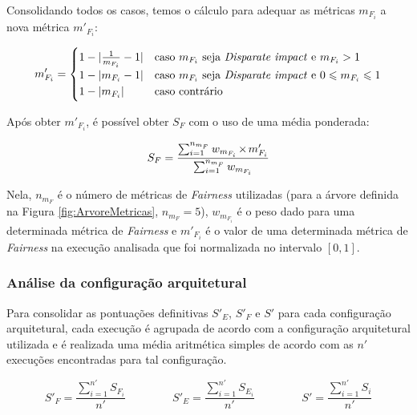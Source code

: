 \documentclass[portugues]{ic-tese}
\let\oldtimes\times
\def\times{{\mkern1mu\oldtimes\mkern1mu}}
\begin{document}
Consolidando todos os casos, temos o cálculo para adequar as métricas $m_{F_i}$ a nova métrica $m'_{F_i}$:

\begin{equation}
\label{eqn:normalizationFairnessStep3}
	\begin{aligned}
	m'_{F_i} = 
	\begin{cases}
	1-\lvert \frac{1}{m_{F_i}}-1 \lvert & \text{caso $m_{F_i}$ seja \textit{Disparate impact} e $m_{F_i} > 1$}\\
	1-\lvert m_{F_i}-1 \lvert & \text{caso $m_{F_i}$ seja \textit{Disparate impact} e $0 \leqslant m_{F_i} \leqslant 1$}\\
	1-\lvert m_{F_i} \rvert & \text{caso contrário}
	\end{cases}
	\end{aligned}
\end{equation}

Após obter $m'_{F_i}$, é possível obter $S_F$ com o uso de uma média ponderada:

\begin{equation}
\label{eqn:FairnessScore}
	\begin{aligned}
	S_{F} = \frac{\sum_{i=1}^{n_{m_F}} w_{m_{F_i}} \times m'_{F_{i}}}{\sum_{i=1}^{n_{m_F}} w_{m_{F_i}}}
	\end{aligned}
\end{equation}

Nela, $n_{m_F}$ é o número de métricas de \textit{Fairness} utilizadas (para a árvore definida na Figura \ref{fig:ArvoreMetricas}, $n_{m_F} = 5$), $w_{m_{F_i}}$ é o peso dado para uma determinada métrica de \textit{Fairness} e $m'_{F_{i}}$ é o valor de uma determinada métrica de \textit{Fairness} na execução analisada que foi normalizada no intervalo $\left[0,1 \right]$. 

\subsubsection{Análise da configuração arquitetural}

Para consolidar as pontuações definitivas $S'_E$, $S'_F$ e $S'$ para cada configuração arquitetural, cada execução é agrupada de acordo com a configuração arquitetural utilizada e é realizada uma média aritmética simples de acordo com as $n'$ execuções encontradas para tal configuração.

\begin{equation}
\label{eqn:configScores}
	S'_F = \frac{\sum_{i=1}^{n'} S_{F_i}}{n'}\;\;\;\;\;\;\;\;\;\;\;\;\;\;\;
	S'_E = \frac{\sum_{i=1}^{n'} S_{E_i}}{n'}\;\;\;\;\;\;\;\;\;\;\;\;\;\;\;
	S' = \frac{\sum_{i=1}^{n'} S_i}{n'}
\end{equation}
\end{document}
